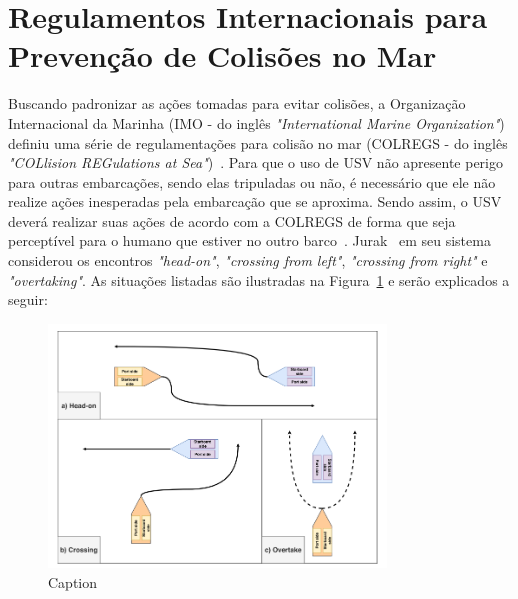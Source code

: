     \section{Regulamentos Internacionais para Prevenção de Colisões no Mar}\label{subchap2:colregs}
        Buscando padronizar as ações tomadas para evitar colisões, a Organização Internacional da Marinha (IMO - do inglês \textit{"International Marine Organization"}) definiu uma série de regulamentações para colisão no mar (COLREGS - do inglês \textit{"COLlision REGulations at Sea"})~\cite{COLREGS}.
        Para que o uso de USV não apresente perigo para outras embarcações, sendo elas tripuladas ou não, é necessário que ele não realize ações inesperadas pela embarcação que se aproxima. Sendo assim, o USV deverá realizar suas ações de acordo com a COLREGS de forma que seja perceptível para o humano que estiver no outro barco~\cite{KUWATA2014110}. Jurak~\cite{JURAK2020} em seu sistema considerou os encontros \textit{"head-on"}, \textit{"crossing from left"}, \textit{"crossing from right"} e \textit{"overtaking"}. As situações listadas são ilustradas na Figura~\ref{fig:Jurak2020_colregsSituations} e serão explicados a seguir: 
        
        \begin{figure}
            \centering
            \includegraphics[width=0.8\textwidth]{fig/chap2/colregs_situations.png}
            \caption{Caption}
            \label{fig:Jurak2020_colregsSituations}
        \end{figure}
        
